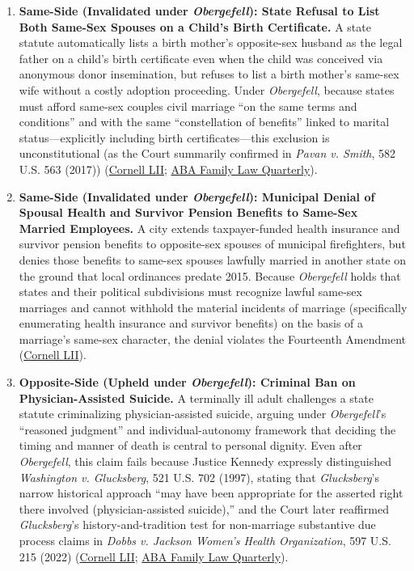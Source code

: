 \documentclass[12pt]{article}
\begin{document}
\begin{enumerate}
    \item \textbf{Same-Side (Invalidated under \textit{Obergefell}): State Refusal to List Both Same-Sex Spouses on a Child's Birth Certificate.} A state statute automatically lists a birth mother's opposite-sex husband as the legal father on a child's birth certificate even when the child was conceived via anonymous donor insemination, but refuses to list a birth mother's same-sex wife without a costly adoption proceeding. Under \textit{Obergefell}, because states must afford same-sex couples civil marriage ``on the same terms and conditions'' and with the same ``constellation of benefits'' linked to marital status---explicitly including birth certificates---this exclusion is unconstitutional (as the Court summarily confirmed in \textit{Pavan v. Smith}, 582 U.S. 563 (2017)) (\href{https://www.law.cornell.edu/supremecourt/text/14-556}{Cornell LII}; \href{https://www.americanbar.org/groups/family_law/resources/family-law-quarterly/2025-december/obergefell-victories-setbacks-protecting-rights-lgbtq-families/}{ABA Family Law Quarterly}).

    \item \textbf{Same-Side (Invalidated under \textit{Obergefell}): Municipal Denial of Spousal Health and Survivor Pension Benefits to Same-Sex Married Employees.} A city extends taxpayer-funded health insurance and survivor pension benefits to opposite-sex spouses of municipal firefighters, but denies those benefits to same-sex spouses lawfully married in another state on the ground that local ordinances predate 2015. Because \textit{Obergefell} holds that states and their political subdivisions must recognize lawful same-sex marriages and cannot withhold the material incidents of marriage (specifically enumerating health insurance and survivor benefits) on the basis of a marriage's same-sex character, the denial violates the Fourteenth Amendment (\href{https://www.law.cornell.edu/supremecourt/text/14-556}{Cornell LII}).

    \item \textbf{Opposite-Side (Upheld under \textit{Obergefell}): Criminal Ban on Physician-Assisted Suicide.} A terminally ill adult challenges a state statute criminalizing physician-assisted suicide, arguing under \textit{Obergefell}'s ``reasoned judgment'' and individual-autonomy framework that deciding the timing and manner of death is central to personal dignity. Even after \textit{Obergefell}, this claim fails because Justice Kennedy expressly distinguished \textit{Washington v. Glucksberg}, 521 U.S. 702 (1997), stating that \textit{Glucksberg}'s narrow historical approach ``may have been appropriate for the asserted right there involved (physician-assisted suicide),'' and the Court later reaffirmed \textit{Glucksberg}'s history-and-tradition test for non-marriage substantive due process claims in \textit{Dobbs v. Jackson Women's Health Organization}, 597 U.S. 215 (2022) (\href{https://www.law.cornell.edu/supremecourt/text/14-556}{Cornell LII}; \href{https://www.americanbar.org/groups/family_law/resources/family-law-quarterly/2025-december/obergefell-victories-setbacks-protecting-rights-lgbtq-families/}{ABA Family Law Quarterly}).


\end{enumerate}
\end{document}
